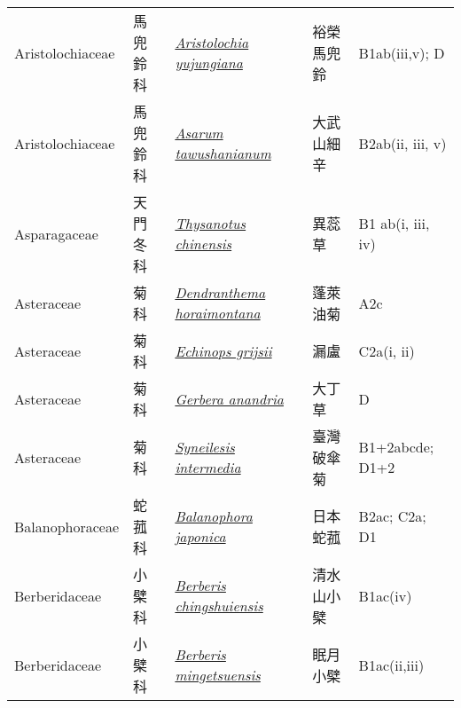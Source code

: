 {\begin{longtable}{p{2.5cm}p{2.5cm}p{4.5cm}p{2.5cm}p{3cm}}
    Aristolochiaceae & 馬兜鈴科 & \href{http://www.theplantlist.org/tpl1.1/search?q=Aristolochia+yujungiana}{\textit{Aristolochia yujungiana} } & 裕榮馬兜鈴 & B1ab(iii,v); D \index{Aristolochia@\textit{Aristolochia}!yujungiana@\textit{yujungiana}}  \index{裕榮馬兜鈴} \\
    Aristolochiaceae & 馬兜鈴科 & \href{http://www.theplantlist.org/tpl1.1/search?q=Asarum+tawushanianum}{\textit{Asarum tawushanianum} } & 大武山細辛 & B2ab(ii, iii, v) \index{Asarum@\textit{Asarum}!tawushanianum@\textit{tawushanianum}}  \index{大武山細辛} \\
    Asparagaceae & 天門冬科 & \href{http://www.theplantlist.org/tpl1.1/search?q=Thysanotus+chinensis}{\textit{Thysanotus chinensis} } & 異蕊草 & B1 ab(i, iii, iv) \index{Thysanotus@\textit{Thysanotus}!chinensis@\textit{chinensis}}  \index{異蕊草} \\
    Asteraceae & 菊科 & \href{http://www.theplantlist.org/tpl1.1/search?q=Dendranthema+horaimontana}{\textit{Dendranthema horaimontana} } & 蓬萊油菊 & A2c \index{Dendranthema@\textit{Dendranthema}!horaimontana@\textit{horaimontana}}  \index{蓬萊油菊} \\
    Asteraceae & 菊科 & \href{http://www.theplantlist.org/tpl1.1/search?q=Echinops+grijsii}{\textit{Echinops grijsii} } & 漏盧 & C2a(i, ii) \index{Echinops@\textit{Echinops}!grijsii@\textit{grijsii}}  \index{漏盧} \\
    Asteraceae & 菊科 & \href{http://www.theplantlist.org/tpl1.1/search?q=Gerbera+anandria}{\textit{Gerbera anandria} } & 大丁草 & D \index{Gerbera@\textit{Gerbera}!anandria@\textit{anandria}}  \index{大丁草} \\
    Asteraceae & 菊科 & \href{http://www.theplantlist.org/tpl1.1/search?q=Syneilesis+intermedia}{\textit{Syneilesis intermedia} } & 臺灣破傘菊 & B1+2abcde; D1+2 \index{Syneilesis@\textit{Syneilesis}!intermedia@\textit{intermedia}}  \index{臺灣破傘菊} \\
    Balanophoraceae & 蛇菰科 & \href{http://www.theplantlist.org/tpl1.1/search?q=Balanophora+japonica}{\textit{Balanophora japonica} } & 日本蛇菰 & B2ac; C2a; D1 \index{Balanophora@\textit{Balanophora}!japonica@\textit{japonica}}  \index{日本蛇菰} \\
    Berberidaceae & 小檗科 & \href{http://www.theplantlist.org/tpl1.1/search?q=Berberis+chingshuiensis}{\textit{Berberis chingshuiensis} } & 清水山小檗 & B1ac(iv) \index{Berberis@\textit{Berberis}!chingshuiensis@\textit{chingshuiensis}}  \index{清水山小檗} \\
    Berberidaceae & 小檗科 & \href{http://www.theplantlist.org/tpl1.1/search?q=Berberis+mingetsuensis}{\textit{Berberis mingetsuensis} } & 眠月小檗 & B1ac(ii,iii) \index{Berberis@\textit{Berberis}!mingetsuensis@\textit{mingetsuensis}}  \index{眠月小檗} \\

\end{longtable}}

